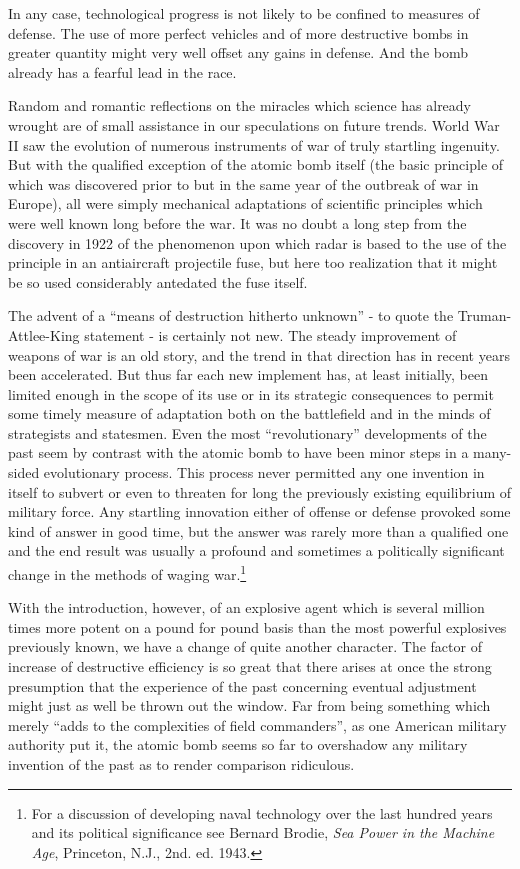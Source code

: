 In any case, technological progress is not likely to be confined to measures of defense. The use of more perfect vehicles and of more destructive bombs in greater quantity might very well offset any gains in defense. And the bomb already has a fearful lead in the race.

Random and romantic reflections on the miracles which science has already wrought are of small assistance in our speculations on future trends. World War II saw the evolution of numerous instruments of war of truly startling ingenuity. But with the qualified exception of the atomic bomb itself (the basic principle of which was discovered prior to but in the same year of the outbreak of war in Europe), all were simply mechanical adaptations of scientific principles which were well known long before the war. It was no doubt a long step from the discovery in 1922 of the phenomenon upon which radar is based to the use of the principle in an antiaircraft projectile fuse, but here too realization that it might be so used considerably antedated the fuse itself.

The advent of a ``means of destruction hitherto unknown'' - to quote the Truman-Attlee-King statement - is certainly not new. The steady improvement of weapons of war is an old story, and the trend in that direction has in recent years been accelerated. But thus far each new implement has, at least initially, been limited enough in the scope of its use or in its strategic consequences to permit some timely measure of adaptation both on the battlefield and in the minds of strategists and statesmen. Even the most ``revolutionary'' developments of the past seem by contrast with the atomic bomb to have been minor steps in a many-sided evolutionary process. This process never permitted any one invention in itself to subvert or even to threaten for long the previously existing equilibrium of military force. Any startling innovation either of offense or defense provoked some kind of answer in good time, but the answer was rarely more than a qualified one and the end result was usually a profound and sometimes a politically significant change in the methods of waging war.\footnote{For a discussion of developing naval technology over the last hundred years and its political significance see Bernard Brodie, \textit{Sea Power in the Machine Age}, Princeton, N.J., 2nd. ed. 1943.}

With the introduction, however, of an explosive agent which is several million times more potent on a pound for pound basis than the most powerful explosives previously known, we have a change of quite another character. The factor of increase of destructive efficiency is so great that there arises at once the strong presumption that the experience of the past concerning eventual adjustment might just as well be thrown out the window. Far from being something which merely ``adds to the complexities of field commanders'', as one American military authority put it, the atomic bomb seems so far to overshadow any military invention of the past as to render comparison ridiculous.

